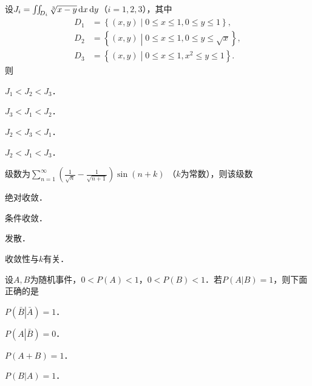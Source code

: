 \documentclass[plain,noanswer,medmath]{../../template/jnuexam}
\begin{document}










\begin{problem}
设$J_i = \iint_{D_i}\sqrt[3]{x-y}\mathop{}\!\mathrm{d} x\mathop{}\!\mathrm{d} y$（$i=1,2,3$），其中
\begin{align*}
  D_1 &  = \left\{(x,y) \middle| 0 \le x \le 1,0 \le y \le 1 \right\}, \\
  D_2 &  = \left\{(x,y) \middle| 0 \le x \le 1,0 \le y \le \sqrt{x} \right\}, \\
  D_3 &  = \left\{(x,y) \middle| 0 \le x \le 1,x^2 \le y \le 1 \right\}.
\end{align*}
则\pickout{}
\begin{abcd}
\item $J_1 < J_2 < J_3$．
\item $J_3 < J_1 < J_2$．
\item $J_2 < J_3 < J_1$．
\item $J_2 < J_1 < J_3$．
\end{abcd}
\end{problem}


\begin{problem}
级数为$\sum_{n = 1}^{\infty}\left(\frac{1}{\sqrt{n}} - \frac{1}{\sqrt{n + 1}} \right)\sin(n + k)$%
（$k$为常数），则该级数\pickout{}
\begin{abcd}
\item 绝对收敛．
\item 条件收敛．
\item 发散．
\item 收敛性与$k$有关．
\end{abcd}
\end{problem}






\begin{problem}
设$A,B$为随机事件，$0 < P(A) < 1$，$0 < P(B) < 1$．若$P(A\left| B \right.) = 1$，则下面正确的是\pickout{}
\begin{abcd}
\item $P(\bar B\left| \bar A \right.) = 1$．
\item $P(A\left| \bar B \right.) = 0$．
\item $P(A + B) = 1$．
\item $P(B\left| A \right.) = 1$．
\end{abcd}
\end{problem}
\end{document}
